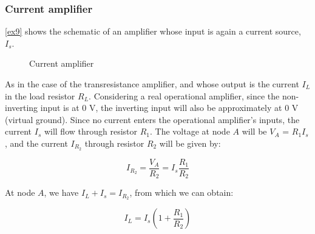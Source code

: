 \documentclass[../main.tex]{subfiles}
\begin{document}
\subsubsection{Current amplifier}	


\autoref{ex9} shows the schematic of an amplifier whose input is again a current source, $I_s$. 


\begin{figure}
\begin{center}



\label{ex9}
\caption{Current amplifier}	
\end{center}	
\end{figure}


As in the case of the transresistance amplifier, and whose output is the current $I_L$ in the load resistor $R_L$. 
Considering a real operational amplifier, since the non-inverting input is at 0 V, the inverting input will also be approximately at 0 V (virtual ground). Since no current enters the operational amplifier’s inputs, the current $I_s$ will flow through resistor $R_1$. The voltage at node $A$ will be $V_A$ = $R_1I_s$, and the current $I_{R_2}$ through resistor $R_2$ will be given by:

\begin{equation}
	I_{R_2} = \frac{V_A}{R_2} = I_s \frac{R_1}{R_2}
\end{equation}

At node $A$, we have $I_L + I_s = I_{R_2}$, from which we can obtain:

\begin{equation}
	I_L = I_s \left( 1 + \frac{R_1}{R_2} \right)
\end{equation}
\end{document}

